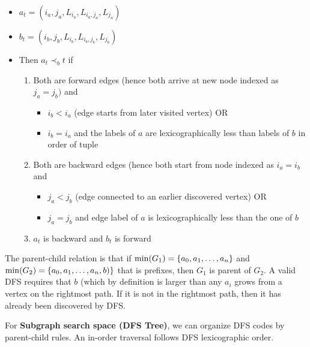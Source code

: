     \begin{itemize}
        \item $a_t = (i_a, j_a, L_{i_a}, L_{i_a, j_a}, L_{j_a})$
        \item $b_t = (i_b, j_b, L_{i_b}, L_{i_b, j_b}, L_{j_b})$
        \item Then $a_t \prec _bt$ if 
        \begin{enumerate}
            \item Both are forward edges (hence both arrive at new node indexed as $j_a = j_b)$ and \begin{itemize}
                \item $i_b < i_a$ (edge starts from later visited vertex) OR
                \item $i_b = i_a$ and the labels of $a$ are lexicographically less than labels of $b$ in order of tuple
            \end{itemize}
            \item Both are backward edges (hence both start from node indexed as $i_a = i_b$ and
            \begin{itemize}
                \item $j_a < j_b$ (edge connected to an earlier discovered vertex) OR
                \item $j_a = j_b$ and edge label of $a$ is lexicographically less than the one of $b$
            \end{itemize}
            \item $a_t$ is backward and $b_t$ is forward
        \end{enumerate}
    \end{itemize}
    
    The parent-child relation is that if $\min(G_1) = \{a_0, a_1, \dots, a_n\}$ and $\min(G_2) = \{a_0, a_1, \dots, a_n, b)\}$ that is prefixes, then $G_1$ is parent of $G_2$. A valid DFS requires that $b$ (which by definition is larger than any $a_i$ grows from a vertex on the rightmost path. If it is not in the rightmost path, then it has already been discovered by DFS.
    
    For \textbf{Subgraph search space (DFS Tree)}, we can organize DFS codes by parent-child rules. An in-order traversal follows DFS lexicographic order.
    
